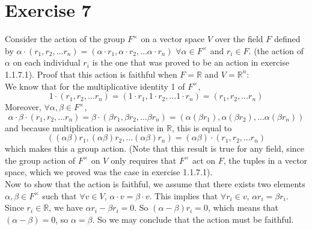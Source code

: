 \documentclass{article}
\newcommand{\R}{\mathbb{R}}
\begin{document}
    \section*{Exercise 7}
    Consider the action of the group $F^\times$ on a vector space $V$
    over the field $F$ defined by $\alpha \cdot (r_1, r_2, \dots r_n)
    = (\alpha \cdot r_1, \alpha \cdot r_2, \dots \alpha \cdot r_n)$
    $\forall \alpha \in F^\times$ and $r_i \in F$.
    (the action of $\alpha$ on each individual $r_i$ is the one that
    was proved to be an action in exercise 1.1.7.1).
    Proof that this action is faithful when $F = \R$ and $V = \R^n$: \\
    We know that for the multiplicative identity 1 of $F^\times$,
    \[ 1 \cdot (r_1, r_2, \dots r_n) =
    (1 \cdot r_1, 1 \cdot r_2, \dots 1 \cdot r_n)
    = (r_1, r_2, \dots r_n) \]
    Moreover, $\forall \alpha, \beta \in F^\times$,
    \[ \alpha \cdot \beta \cdot (r_1, r_2, \dots r_n)
    = \beta \cdot (\beta r_1, \beta r_2, \dots \beta r_n)
    = (\alpha (\beta r_1), \alpha (\beta r_2),
    \dots \alpha (\beta r_n)) \]
    and because multiplication is associative in $\R$, this is equal to
    \[((\alpha \beta) r_1, (\alpha \beta) r_2,
    \dots (\alpha \beta) r_n)
     = (\alpha \beta) \cdot (r_1, r_2, \dots r_n) \]
    which makes this a group action.
    (Note that this result is true for any field,
    since the group action of $F^\times$ on $V$ only requires that
    $F^\times$ act on $F$, the tuples in a vector space,
    which we proved was the case in exercise 1.1.7.1). \\
    Now to show that the action is faithful,
    we assume that there exists two elements $\alpha, \beta \in F^\times$
    such that $\forall v \in V$, $\alpha \cdot v = \beta \cdot v$.
    This implies that $\forall r_i \in v$,
    $\alpha r_i = \beta r_i$.
    Since $r_i \in \R$,
    we have $\alpha r_i - \beta r_i = 0$.
    So $(\alpha - \beta) r_i = 0$,
    which means that $(\alpha - \beta) = 0$,
    so $\alpha = \beta$.
    So we may conclude that the action must be faithful.
\end{document}
